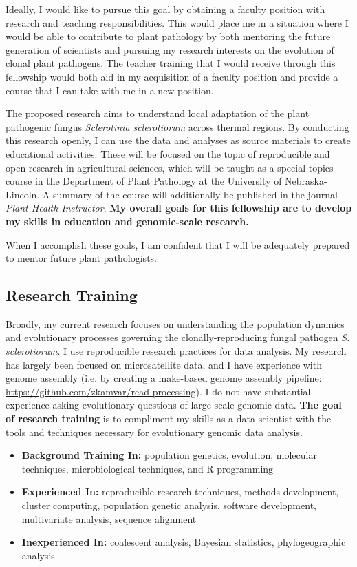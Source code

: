 \documentclass[12pt,letterpaper]{article}
\begin{document}
Ideally, I would like to pursue this goal by obtaining a faculty position with
research and teaching responsibilities. 
This would place me in a situation where I would be able to contribute to plant pathology by both mentoring the future generation of scientists and pursuing my research interests on the evolution of clonal plant pathogens.
The teacher training that I would receive through this fellowship would both aid in my acquisition of a faculty position and provide a course that I can take
with me in a new position.

The proposed research aims to understand local adaptation of the plant pathogenic fungus \textit{Sclerotinia sclerotiorum} across thermal regions. 
By conducting this research openly, I can use the data and analyses as source materials to create educational activities. 
These will be focused on the topic of reproducible and open research in agricultural sciences, which will be taught as a special topics course in the Department of Plant Pathology at the University of Nebraska-Lincoln. 
A summary of the course will additionally be published in the journal \textit{Plant Health Instructor}. 
\textbf{My overall goals for this fellowship are to develop my skills in education and genomic-scale research.}

When I accomplish these goals, I am confident that I will be adequately prepared to mentor future plant pathologists.

\subsection{Research Training}

Broadly, my current research focuses on understanding the population dynamics and evolutionary processes governing the clonally-reproducing fungal pathogen \textit{S. sclerotiorum}.
I use reproducible research practices for data analysis. 
My research has largely been focused on microsatellite data, and I have experience with genome assembly (i.e. by creating a make-based genome assembly pipeline: \url{https://github.com/zkamvar/read-processing}).
I do not have substantial experience asking evolutionary questions of large-scale genomic data. 
\textbf{The goal of research training} is to compliment my skills as a data scientist with the tools and techniques necessary for evolutionary genomic data analysis. 

\begin{itemize}
  \item \textbf{Background Training In:} population genetics, evolution, molecular techniques, microbiological techniques, and R programming
  \item \textbf{Experienced In:} reproducible research techniques, methods development, cluster computing, population genetic analysis, software development, multivariate analysis, sequence alignment
  \item \textbf{Inexperienced In:} coalescent analysis, Bayesian statistics, phylogeographic analysis
\end{itemize}
\end{document}
